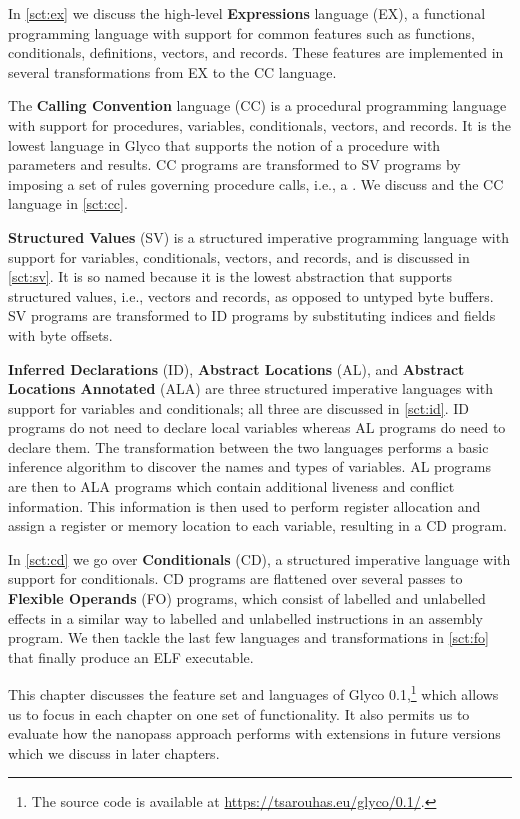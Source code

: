 \documentclass[main.tex]{subfiles}
\begin{document}
In \cref{sct:ex} we discuss the high-level \textbf{Expressions} language (EX), a functional programming language with support for common features such as functions, conditionals, definitions, vectors, and records. These features are implemented in several transformations from EX to the CC language.

The \textbf{Calling Convention} language (CC) is a procedural programming language with support for procedures, variables, conditionals, vectors, and records. It is the lowest language in Glyco that supports the notion of a procedure with parameters and results. CC programs are transformed to SV programs by imposing a set of rules governing procedure calls, i.e., a . We discuss  and the CC language in \cref{sct:cc}.

\textbf{Structured Values} (SV) is a structured imperative programming language with support for variables, conditionals, vectors, and records, and is discussed in \cref{sct:sv}. It is so named because it is the lowest abstraction that supports structured values, i.e., vectors and records, as opposed to untyped byte buffers. SV programs are transformed to ID programs by substituting indices and fields with byte offsets.

\textbf{Inferred Declarations} (ID), \textbf{Abstract Locations} (AL), and \textbf{Abstract Locations Annotated} (ALA) are three structured imperative languages with support for variables and conditionals; all three are discussed in \cref{sct:id}. ID programs do not need to declare local variables whereas AL programs do need to declare them. The transformation between the two languages performs a basic inference algorithm to discover the names and types of variables. AL programs are then \lowered{} to ALA programs which contain additional liveness and conflict information. This information is then used to perform register allocation and assign a register or memory location to each variable, resulting in a CD program.

In \cref{sct:cd} we go over \textbf{Conditionals} (CD), a structured imperative language with support for conditionals. CD programs are flattened over several passes to \textbf{Flexible Operands} (FO) programs, which consist of labelled and unlabelled effects in a similar way to labelled and unlabelled instructions in an assembly program. We then tackle the last few languages and transformations in \cref{sct:fo} that finally produce an ELF executable.

This chapter discusses the feature set and languages of Glyco 0.1,\footnote{The source code is available at \url{https://tsarouhas.eu/glyco/0.1/}.} which allows us to focus in each chapter on one set of functionality. It also permits us to evaluate how the nanopass approach performs with extensions in future versions which we discuss in later chapters.
\end{document}
